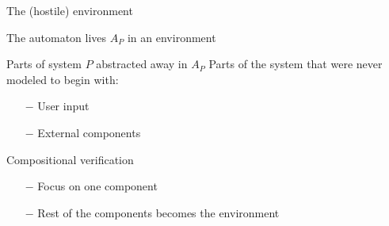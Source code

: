 \documentclass[../talk.tex]{subfiles}
\begin{document}
\begin{frame}{The (hostile) environment}
    \begin{overlayarea}{\slidewidth}{\slideheight}

        The automaton lives $A_P$ in an \alert{environment}

        \begin{itemize}
             Parts of system $P$ abstracted away in $A_P$
             Parts of the system that were never modeled to begin with:\hspace*{-1em}
                \begin{itemize}
                    \item[$-$] User input
                    \item[$-$] External components
                \end{itemize}
             Compositional verification
                \begin{itemize}
                    \item[$-$] Focus on one component
                    \item[$-$] Rest of the components becomes the environment
                \end{itemize}
        \end{itemize}

    \end{overlayarea}
\end{frame}
\end{document}
